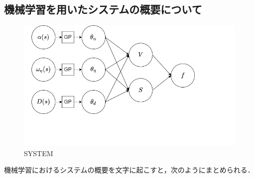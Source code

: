 \documentclass[11pt]{jsarticle}
\begin{document}
		\subsection{機械学習を用いたシステムの概要について}
			\begin{figure}[h!]
				\centering
				\includegraphics[scale=0.5]{./figure/systems.png}
				\caption{SYSTEM}
			\end{figure}
			機械学習におけるシステムの概要を文字に起こすと，次のようにまとめられる．
\end{document}
